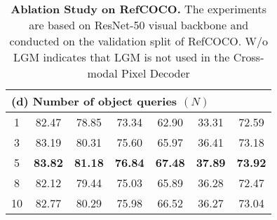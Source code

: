 \begin{table*}[h]
\begin{tabular}{c|c|c|c|c|c|c}
\multicolumn{7}{l}{\textbf{(d)} Number of object queries $(N)$}                                                                                                                                                                                                             \\ \midrule
1                          & 82.47             & 78.85             & 73.34             & 62.90              & 33.31             & 72.59   \\
3                          & 83.19             & 80.31             & 75.60             & 65.97              & 36.41             & 73.18   \\
5                          & \textbf{83.82}             & \textbf{81.18}             & \textbf{76.84}             & \textbf{67.48}             & \textbf{37.89}             & \textbf{73.92}   \\
8                          & 82.12             & 79.44             & 75.03             & 65.89              & 36.28             & 72.47   \\
10                         & 82.77             & 80.29             & 75.98             & 66.52             & 36.27             & 73.04
 \\ \bottomrule
\end{tabular}
\caption{\textbf{Ablation Study on RefCOCO.} The experiments are based on ResNet-50 visual backbone and conducted on the validation split of RefCOCO. W/o LGM indicates that LGM is not used in the Cross-modal Pixel Decoder}
\label{tab:ablation}
\end{table*}